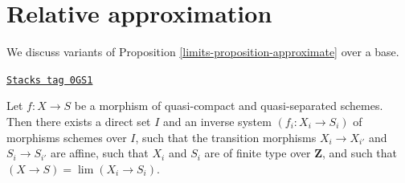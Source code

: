 \section{Relative approximation}
\label{limits-section-relative-approximation}
We discuss variants of Proposition \ref{limits-proposition-approximate}
over a base.

\begin{lemma}
\label{limits-lemma-approximate-morphism}
\href{https://stacks.math.columbia.edu/tag/0GS1}{\texttt{Stacks tag 0GS1}}

Let $f : X \to S$ be a morphism of quasi-compact and quasi-separated schemes.
Then there exists a direct set $I$ and an inverse system $(f_i : X_i \to S_i)$
of morphisms schemes over $I$, such that the transition morphisms
$X_i \to X_{i'}$ and $S_i \to S_{i'}$ are affine, such that $X_i$
and $S_i$ are of finite type over $\mathbf{Z}$, and such that
$(X \to S) = \lim (X_i \to S_i)$.
\end{lemma}

